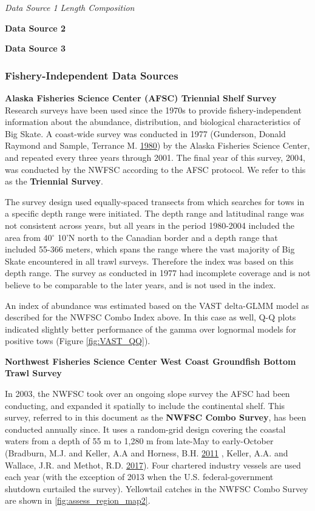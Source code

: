 \documentclass[12pt,]{article}
\begin{document}
\emph{Data Source 1 Length Composition}

\textbf{Data Source 2}

\textbf{Data Source 3}

\hypertarget{fishery-independent-data-sources}{%
\subsubsection{Fishery-Independent Data
Sources}\label{fishery-independent-data-sources}}

\textbf{Alaska Fisheries Science Center (AFSC) Triennial Shelf Survey}\\
Research surveys have been used since the 1970s to provide
fishery-independent information about the abundance, distribution, and
biological characteristics of Big Skate. A coast-wide survey was
conducted in 1977 (Gunderson, Donald Raymond and Sample, Terrance M.
\protect\hyperlink{ref-Gunderson1980}{1980}) by the Alaska Fisheries
Science Center, and repeated every three years through 2001. The final
year of this survey, 2004, was conducted by the NWFSC according to the
AFSC protocol. We refer to this as the \textbf{Triennial Survey}.

The survey design used equally-spaced transects from which searches for
tows in a specific depth range were initiated. The depth range and
latitudinal range was not consistent across years, but all years in the
period 1980-2004 included the area from 40\(^\circ\) 10'N north to the
Canadian border and a depth range that included 55-366 meters, which
spans the range where the vast majority of Big Skate encountered in all
trawl surveys. Therefore the index was based on this depth range. The
survey as conducted in 1977 had incomplete coverage and is not believe
to be comparable to the later years, and is not used in the index.

An index of abundance was estimated based on the VAST delta-GLMM model
as described for the NWFSC Combo Index above. In this case as well, Q-Q
plots indicated slightly better performance of the gamma over lognormal
models for positive tows (Figure \ref{fig:VAST_QQ}).

\textbf{Northwest Fisheries Science Center West Coast Groundfish Bottom
Trawl Survey}

In 2003, the NWFSC took over an ongoing slope survey the AFSC had been
conducting, and expanded it spatially to include the continental shelf.
This survey, referred to in this document as the \textbf{NWFSC Combo
Survey}, has been conducted annually since. It uses a random-grid design
covering the coastal waters from a depth of 55 m to 1,280 m from
late-May to early-October (Bradburn, M.J. and Keller, A.A and Horness,
B.H. \protect\hyperlink{ref-Bradburn2011}{2011} , Keller, A.A. and
Wallace, J.R. and Methot, R.D.
\protect\hyperlink{ref-Keller2017}{2017}). Four chartered industry
vessels are used each year (with the exception of 2013 when the U.S.
federal-government shutdown curtailed the survey). Yellowtail catches in
the NWFSC Combo Survey are shown in \ref{fig:assess_region_map2}.
\end{document}

